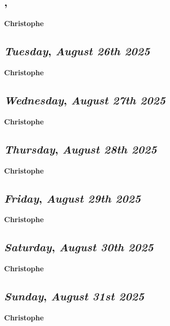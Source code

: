 \subsection*{\weekday, \day}
\textbf {Christophe}

\def\day{\textit{August 26th 2025}}
\def\weekday{\textit{Tuesday}}
\subsection*{\weekday, \day}
\textbf {Christophe}

\def\day{\textit{August 27th 2025}}
\def\weekday{\textit{Wednesday}}
\subsection*{\weekday, \day}
\textbf {Christophe}

\def\day{\textit{August 28th 2025}}
\def\weekday{\textit{Thursday}}
\subsection*{\weekday, \day}
\textbf {Christophe}

\def\day{\textit{August 29th 2025}}
\def\weekday{\textit{Friday}}
\subsection*{\weekday, \day}
\textbf {Christophe}

\def\day{\textit{August 30th 2025}}
\def\weekday{\textit{Saturday}}
\subsection*{\weekday, \day}
\textbf {Christophe}

\def\day{\textit{August 31st 2025}}
\def\weekday{\textit{Sunday}}
\subsection*{\weekday, \day}
\textbf {Christophe}
